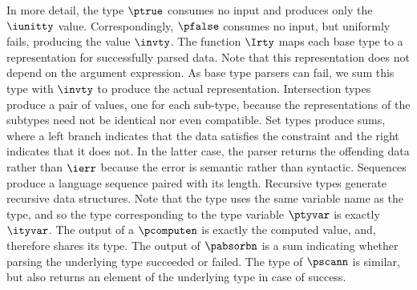 In more detail,
the \ddc{} type $\ptrue$ consumes no input and produces only
the $\iunitty$ value.  Correspondingly, $\pfalse$ consumes no input,
but uniformly fails, producing the value $\invty$. The
function $\Irty$ maps each base type to a representation for
successfully parsed data. Note that this representation does not depend
on the argument expression. As base type parsers can fail, we sum this type
with $\invty$ to produce the actual representation.
Intersection types produce a pair of values, one for each sub-type,
because the representations of the subtypes need not be identical nor
even compatible. 
Set types produce sums, where a left branch indicates that the data
satisfies the constraint and the right indicates that it does not. In
the latter case, the parser returns the offending data rather than
$\ierr$ because the error is semantic rather than syntactic.
Sequences produce a \implang{} language sequence paired with its
length.  Recursive types generate recursive \implang{} data
structures. Note that the \implang{} type uses the same variable name
as the \ddc{} type, and so the type corresponding to the type variable
$\ptyvar$ is exactly $\ityvar$.
The output of a $\pcomputen$ is exactly the computed value, and,
therefore shares its type.  The output of $\pabsorbn$ is a sum
indicating whether parsing the underlying type succeeded or failed.
The type of $\pscann$ is similar, but also returns an element of the
underlying type in case of success.

